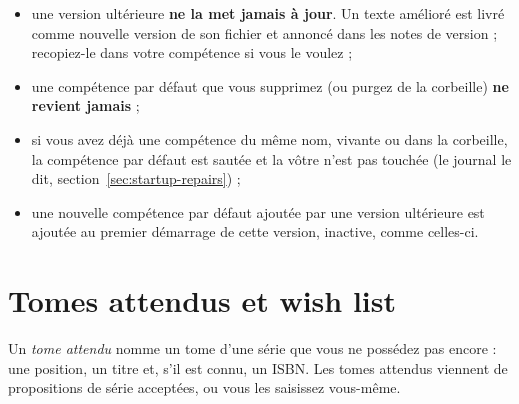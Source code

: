 \begin{itemize}
  \item une version ultérieure \textbf{ne la met jamais à jour}. Un
        texte amélioré est livré comme nouvelle version de son fichier
        et annoncé dans les notes de version ; recopiez-le dans votre
        compétence si vous le voulez ;
  \item une compétence par défaut que vous supprimez (ou purgez de la
        corbeille) \textbf{ne revient jamais} ;
  \item si vous avez déjà une compétence du même nom, vivante ou dans la
        corbeille, la compétence par défaut est sautée et la vôtre n'est
        pas touchée (le journal le dit,
        section~\ref{sec:startup-repairs}) ;
  \item une nouvelle compétence par défaut ajoutée par une version
        ultérieure est ajoutée au premier démarrage de cette version,
        inactive, comme celles-ci.
\end{itemize}

\section{Tomes attendus et wish list}
\label{sec:expected-tomes}

Un \emph{tome attendu} nomme un tome d'une série
que vous ne possédez pas encore : une position, un titre et, s'il est
connu, un ISBN. Les tomes attendus viennent de propositions de série
acceptées, ou vous les saisissez vous-même.

